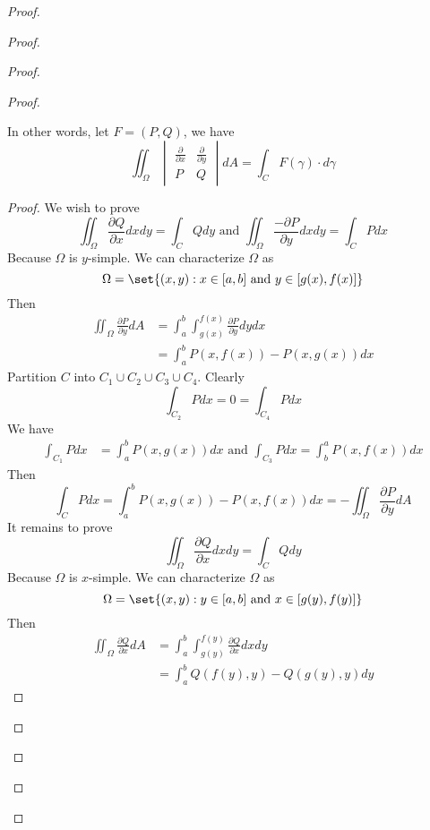 \documentclass{report}
\begin{document}
\begin{proof}
\begin{proof}
\begin{proof}
\begin{proof}
\begin{theorem}
In other words, let $F=(P,Q)$, we have 
\begin{equation}
\iint_{\Omega} \begin{vmatrix}
    \frac{\partial}{\partial x} & \frac{\partial}{\partial  y}\\
    P & Q 
\end{vmatrix} dA=\int_{C} F(\gamma )\cdot d\gamma 
\end{equation}
\end{theorem}
\begin{proof}
We wish to prove
\begin{equation}
\iint_{\Omega} \frac{\partial  Q}{\partial x}dxdy=\int_C Qdy\text{ and }\iint_{\Omega} \frac{-\partial P}{\partial y}dxdy=\int_C Pdx
\end{equation}
Because $\Omega$ is $y$-simple. We can characterize $\Omega$ as
\begin{equation}
\Omega=\set{(x,y):x\in [a,b]\text{ and }y\in [g(x),f(x)]}
\end{equation}
Then
\begin{align}
\iint_\Omega \frac{\partial P}{\partial y}dA&=\int_a^b \int_{g(x)}^{f(x)} \frac{\partial P}{\partial y}dy dx\\
&=\int_a^b P(x,f(x))-P(x,g(x))dx
\end{align}
Partition $C$ into  $C_1\cup C_2\cup C_3\cup C_4$. Clearly
\begin{equation}
\int_{C_2}Pdx=0=\int_{C_4}Pdx
\end{equation}
We have
\begin{align}
\int_{C_1}Pdx&=\int_a^b P(x,g(x))dx\text{ and }\int_{C_3}Pdx=\int_b^a P(x,f(x))dx
\end{align}
Then
\begin{equation}
\int_{C}Pdx=\int_a^b P(x,g(x))-P(x,f(x))dx=-\iint_\Omega \frac{\partial P}{\partial y}dA
\end{equation}
It remains to prove
\begin{equation}
\iint_{\Omega} \frac{\partial Q}{\partial  x}dxdy=\int_C Qdy
\end{equation}
Because $\Omega$ is $x$-simple. We can characterize  $\Omega$ as
\begin{equation}
\Omega=\set{(x,y):y\in [a,b]\text{ and }x\in [g(y),f(y)]}
\end{equation}
Then
\begin{align}
\iint_\Omega \frac{\partial Q}{\partial x}dA&=\int_a^b\int_{g(y)}^{f(y)} \frac{\partial Q}{\partial x}dxdy\\
&=\int_a^b Q(f(y),y)-Q(g(y),y)dy

\end{align}
\end{proof}
\end{proof}
\end{proof}
\end{proof}
\end{proof}
\end{document}
